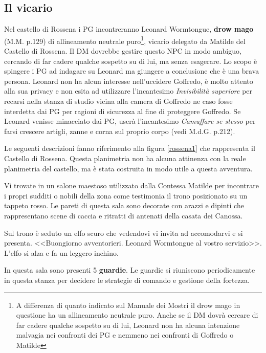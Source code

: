 \documentclass[letterpaper,twocolumn,openany,nodeprecatedcode]{dndbook}
\begin{document}
\subsection{Il vicario}
Nel castello di Rossena i PG incontreranno Leonard Wormtongue, \textbf{drow mago} (M.M. p.129) di allineamento neutrale puro\footnote{A differenza di quanto indicato sul Manuale dei Mostri\cite{dnd:mostri} il drow mago in questione ha un allineamento neutrale puro. Anche se il DM dovrà cercare di far cadere qualche sospetto su di lui, Leonard non ha alcuna intenzione malvagia nei confronti dei PG e nemmeno nei confronti di Goffredo o Matilde}, vicario delegato da Matilde del Castello di Rossena. Il DM dovrebbe gestire questo NPC in modo ambiguo, cercando di far cadere qualche sospetto su di lui, ma senza esagerare. Lo scopo è spingere i PG ad indagare su Leonard ma giungere a conclusione che è una brava persona. Leonard non ha alcun interesse nell'uccidere Goffredo, è molto attento alla sua privacy e non esita ad utilizzare l'incantesimo \textit{Invisibilità superiore} per recarsi nella stanza di studio vicina alla camera di Goffredo ne caso fosse interdetta dai PG per ragioni di sicurezza al fine di proteggere Goffredo. Se Leonard venisse minacciato dai PG, userà l'incantesimo \textit{Camuffare se stesso} per farsi crescere artigli, zanne e corna sul proprio corpo (vedi M.d.G. p.212\cite{dnd:giocatore}).

Le seguenti descrizioni fanno riferimento alla figura \ref{rossena1} che rappresenta il Castello di Rossena. Questa planimetria non ha alcuna attinenza con la reale planimetria del castello, ma è stata costruita in modo utile a questa avventura.

\begin{DndReadAloud}
Vi trovate in un salone maestoso utilizzato dalla Contessa Matilde per incontrare i propri sudditi o nobili della zona come testimonia il trono posizionato su un tappeto rosso. Le pareti di questa sala sono decorate con arazzi e dipinti che rappresentano scene di caccia e ritratti di antenati della casata dei Canossa.

Sul trono è seduto un elfo scuro che vedendovi vi invita ad accomodarvi e si presenta. <<Buongiorno avventorieri. Leonard Wormtongue al vostro servizio>>. L'elfo si alza e fa un leggero inchino.
\end{DndReadAloud}

In questa sala sono presenti 5 \textbf{guardie}. Le guardie si riuniscono periodicamente in questa stanza per decidere le strategie di comando e gestione della fortezza.
\end{document}
